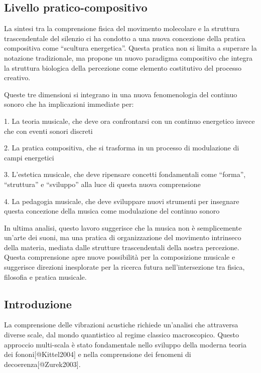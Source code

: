 \documentclass{gs-adonis}
\begin{document}
\subsection{Livello
pratico-compositivo}\label{livello-pratico-compositivo}

La sintesi tra la comprensione fisica del movimento molecolare e la
struttura trascendentale del silenzio ci ha condotto a una nuova
concezione della pratica compositiva come ``scultura energetica''.
Questa pratica non si limita a superare la notazione tradizionale, ma
propone un nuovo paradigma compositivo che integra la struttura
biologica della percezione come elemento costitutivo del processo
creativo.

Queste tre dimensioni si integrano in una nuova fenomenologia del
continuo sonoro che ha implicazioni immediate per:

1. La teoria musicale, che deve ora confrontarsi con un continuo
energetico invece che con eventi sonori discreti

2. La pratica compositiva, che si trasforma in un processo di
modulazione di campi energetici

3. L'estetica musicale, che deve ripensare concetti fondamentali come
``forma'', ``struttura'' e ``sviluppo'' alla luce di questa nuova
comprensione

4. La pedagogia musicale, che deve sviluppare nuovi strumenti per
insegnare questa concezione della musica come modulazione del continuo
sonoro

In ultima analisi, questo lavoro suggerisce che la musica non è
semplicemente un'arte dei suoni, ma una pratica di organizzazione del
movimento intrinseco della materia, mediata dalle strutture
trascendentali della nostra percezione. Questa comprensione apre nuove
possibilità per la composizione musicale e suggerisce direzioni
inesplorate per la ricerca futura nell'intersezione tra fisica,
filosofia e pratica musicale.

\subsection{Introduzione}\label{introduzione}

La comprensione delle vibrazioni acustiche richiede un'analisi che
attraversa diverse scale, dal mondo quantistico al regime classico
macroscopico. Questo approccio multi-scala è stato fondamentale nello
sviluppo della moderna teoria dei fononi{[}@Kittel2004{]} e nella
comprensione dei fenomeni di decoerenza{[}@Zurek2003{]}.
\end{document}
